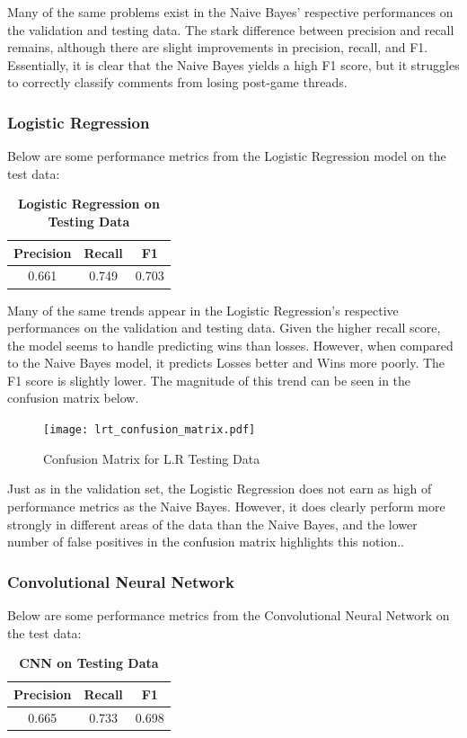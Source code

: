 \documentclass[twocolumn]{article}
\begin{document}
Many of the same problems exist in the Naive Bayes' respective performances on the validation and testing data. The stark difference between precision and recall remains, although there are slight improvements in precision, recall, and F1. Essentially, it is clear that the Naive Bayes yields a high F1 score, but it struggles to correctly classify comments from losing post-game threads.

\subsubsection{Logistic Regression}
Below are some performance metrics from the Logistic Regression model on the test data:

\begin{table}[H]
\centering %
\caption{\textbf{Logistic Regression on Testing Data}} 

\begin{tabular}{ccc} 
\toprule
Precision & Recall & F1 \\ 
\midrule
0.661 & 0.749 & 0.703 \\
\bottomrule
\end{tabular}
\end{table}

Many of the same trends appear in the Logistic Regression's respective performances on the validation and testing data. Given the higher recall score, the model seems to handle predicting wins than losses. However, when compared to the Naive Bayes model, it predicts Losses better and Wins more poorly. The F1 score is slightly lower. The magnitude of this trend can be seen in the confusion matrix below.

\begin{figure}[H]
    \centering
    \texttt{[image: lrt\_confusion\_matrix.pdf]}
    \caption{Confusion Matrix for L.R Testing Data}
\end{figure}

Just as in the validation set, the Logistic Regression does not earn as high of performance metrics as the Naive Bayes. However, it does clearly perform more strongly in different areas of the data than the Naive Bayes, and the lower number of false positives in the confusion matrix highlights this notion..

\subsubsection{Convolutional Neural Network}
Below are some performance metrics from the Convolutional Neural Network on the test data:
\begin{table}[H]
\centering %
\caption{\textbf{CNN on Testing Data}} 

\begin{tabular}{ccc} 
\toprule
Precision & Recall & F1 \\ 
\midrule
0.665 & 0.733 & 0.698 \\
\bottomrule
\end{tabular}
\end{table}
\end{document}
